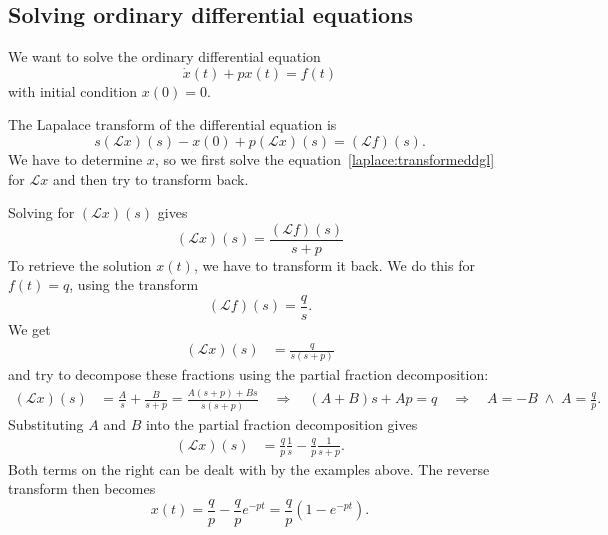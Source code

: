 \subsection{Solving ordinary differential equations}
We want to solve the ordinary differential equation
\[
\dot x(t)+px(t)=f(t)
\]
with initial condition $x(0)=0$.

The Lapalace transform of the differential equation is
\begin{equation}
s(\mathscr{L}x)(s)-x(0)+p(\mathscr{L}x)(s)=(\mathscr{L}f)(s).
\label{laplace:transformeddgl}
\end{equation}
We have to determine $x$, so we first solve the
equation~\eqref{laplace:transformeddgl} for $\mathscr{L}x$ and
then try to transform back.

Solving for $(\mathscr{L}x)(s)$ gives
\[
(\mathscr{L}x)(s)
=
\frac{(\mathscr{L}f)(s)}{s+p}
\]
To retrieve the solution $x(t)$, we have to transform it back.
We do this for $f(t)=q$, using the transform
\[
(\mathscr{L}f)(s)=\frac{q}{s}.
\]
We get
\begin{align*}
(\mathscr{L}x)(s)
&=
\frac{q}{s(s+p)}
\end{align*}
and try to decompose these fractions using the partial fraction
decomposition:
\begin{align*}
(\mathscr{L}x)(s)
&=
\frac{A}{s} + \frac{B}{s+p}
=
\frac{A(s+p) + Bs}{s(s+p)}
\quad\Rightarrow\quad
(A+B)s + Ap = q
\quad\Rightarrow\quad
A=-B\;\wedge\; A=\frac{q}{p}.
\end{align*}
Substituting $A$ and $B$ into the partial fraction decomposition gives
\begin{align*}
(\mathscr{L}x)(s)
&=
\frac{q}{p}\frac{1}{s}-\frac{q}{p}\frac{1}{s+p}.
\end{align*}
Both terms on the right can be dealt with by the examples
above.
The reverse transform then becomes
\[
x(t)=\frac{q}{p}-\frac{q}{p}e^{-pt}=\frac{q}{p}(1-e^{-pt}).
\]

